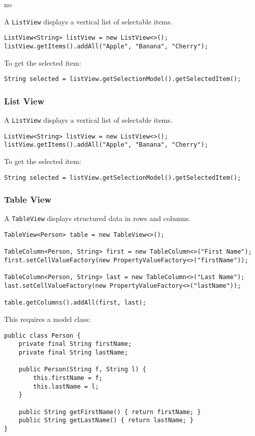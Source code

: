 no\documentclass{article}
\newcommand{\codecmd}[1]{\textcolor[rgb]{0,0.5,0}{\texttt{#1}}}
\begin{document}
A \codecmd{ListView} displays a vertical list of selectable items.

\begin{verbatim}
ListView<String> listView = new ListView<>();
listView.getItems().addAll("Apple", "Banana", "Cherry");
\end{verbatim}

\noindent To get the selected item:
\begin{verbatim}
String selected = listView.getSelectionModel().getSelectedItem();
\end{verbatim}

\subsubsection{List View}

A \codecmd{ListView} displays a vertical list of selectable items.

\begin{verbatim}
ListView<String> listView = new ListView<>();
listView.getItems().addAll("Apple", "Banana", "Cherry");
\end{verbatim}

\noindent To get the selected item:
\begin{verbatim}
String selected = listView.getSelectionModel().getSelectedItem();
\end{verbatim}

\subsubsection{Table View}

A \codecmd{TableView} displays structured data in rows and columns.

\begin{verbatim}
TableView<Person> table = new TableView<>();

TableColumn<Person, String> first = new TableColumn<>("First Name");
first.setCellValueFactory(new PropertyValueFactory<>("firstName"));

TableColumn<Person, String> last = new TableColumn<>("Last Name");
last.setCellValueFactory(new PropertyValueFactory<>("lastName"));

table.getColumns().addAll(first, last);
\end{verbatim}

\noindent This requires a model class:
\begin{verbatim}
public class Person {
    private final String firstName;
    private final String lastName;

    public Person(String f, String l) {
        this.firstName = f;
        this.lastName = l;
    }

    public String getFirstName() { return firstName; }
    public String getLastName() { return lastName; }
}
\end{verbatim}
\end{document}
